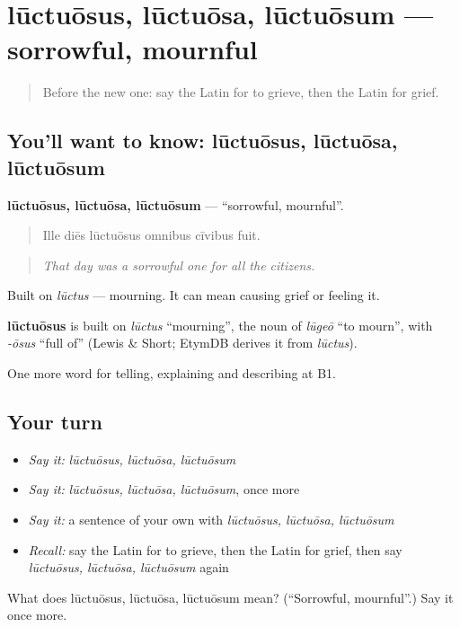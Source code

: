 \section[lūctuōsus, lūctuōsa, lūctuōsum]{lūctuōsus, lūctuōsa, lūctuōsum — sorrowful, mournful}

\label{lesson:LA-C490-luctuosus}



\begin{quote}
Before the new one: say the Latin for to grieve, then the Latin for grief.
\end{quote}

\subsection*{You'll want to know: lūctuōsus, lūctuōsa, lūctuōsum}
\textbf{lūctuōsus, lūctuōsa, lūctuōsum} — \textquotedblleft{}sorrowful, mournful\textquotedblright{}.

\begin{quote}
Ille diēs lūctuōsus omnibus cīvibus fuit.
\end{quote}

\begin{quote}
\emph{That day was a sorrowful one for all the citizens.}
\end{quote}

Built on \emph{lūctus} — mourning. It can mean causing grief or feeling it.

\begin{cousinweb}
\textbf{lūctuōsus} is built on \emph{lūctus} \textquotedblleft{}mourning\textquotedblright{}, the noun of \emph{lūgeō} \textquotedblleft{}to mourn\textquotedblright{}, with \emph{-ōsus} \textquotedblleft{}full of\textquotedblright{} (Lewis \& Short; EtymDB derives it from \emph{lūctus}).
\end{cousinweb}

\begin{grammarlens}[title={What you've built}]
One more word for telling, explaining and describing at B1.
\end{grammarlens}

\subsection*{Your turn}
\begin{itemize}
\raggedright
  \item \emph{Say it:} \emph{lūctuōsus, lūctuōsa, lūctuōsum}
  \item \emph{Say it:} \emph{lūctuōsus, lūctuōsa, lūctuōsum}, once more
  \item \emph{Say it:} a sentence of your own with \emph{lūctuōsus, lūctuōsa, lūctuōsum}
  \item \emph{Recall:} say the Latin for to grieve, then the Latin for grief, then say \emph{lūctuōsus, lūctuōsa, lūctuōsum} again
\end{itemize}

\begin{tcolorbox}[breakable,colback=teal!4,colframe=teal!35!black,title={Before you move on}]
What does lūctuōsus, lūctuōsa, lūctuōsum mean? (\textquotedblleft{}Sorrowful, mournful\textquotedblright{}.) Say it once more.
\end{tcolorbox}
